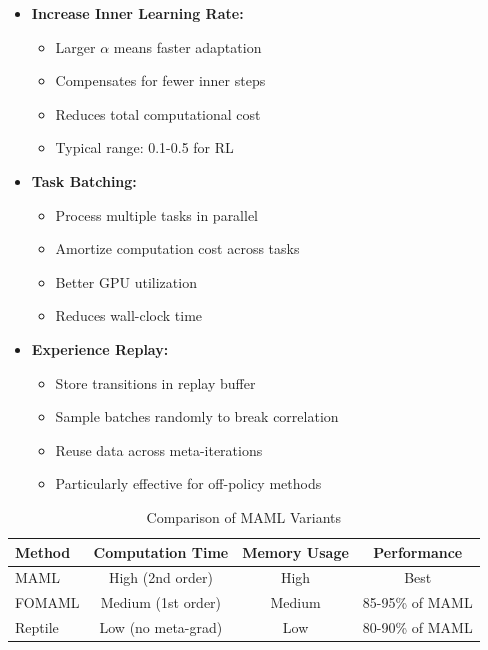 \documentclass[12pt]{article}
\begin{document}
{{\begin{enumerate}
				\begin{itemize}
					\item \textbf{Increase Inner Learning Rate:}
					\begin{itemize}
						\item Larger $\alpha$ means faster adaptation
						\item Compensates for fewer inner steps
						\item Reduces total computational cost
						\item Typical range: 0.1-0.5 for RL
					\end{itemize}
					
					\item \textbf{Task Batching:}
					\begin{itemize}
						\item Process multiple tasks in parallel
						\item Amortize computation cost across tasks
						\item Better GPU utilization
						\item Reduces wall-clock time
					\end{itemize}
					
					\item \textbf{Experience Replay:}
					\begin{itemize}
						\item Store transitions in replay buffer
						\item Sample batches randomly to break correlation
						\item Reuse data across meta-iterations
						\item Particularly effective for off-policy methods
					\end{itemize}
				\end{itemize}
			\end{enumerate}
			
			\begin{table}[H]
			\centering
			\caption{Comparison of MAML Variants}
			\begin{tabular}{@{}lccc@{}}
			\toprule
			\textbf{Method} & \textbf{Computation Time} & \textbf{Memory Usage} & \textbf{Performance} \\
			\midrule
			MAML & High (2nd order) & High & Best \\
			FOMAML & Medium (1st order) & Medium & 85-95\% of MAML \\
			Reptile & Low (no meta-grad) & Low & 80-90\% of MAML \\
			\bottomrule
			\end{tabular}
			\label{tab:maml_variants}
			\end{table}
			
}}
\end{document}
